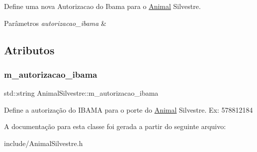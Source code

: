 Define uma nova Autorizacao do Ibama para o \hyperlink{classAnimal}{Animal} Silvestre. 


\begin{DoxyParams}{Parâmetros}
{\em autorizacao\+\_\+ibama} & \\
\hline
\end{DoxyParams}


\subsection{Atributos}
\mbox{\label{classAnimalSilvestre_a921c430fa2507062e3a2605599dd6735}} 
\subsubsection{\texorpdfstring{m\+\_\+autorizacao\+\_\+ibama}{m\_autorizacao\_ibama}}
{\footnotesize\ttfamily std\+::string Animal\+Silvestre\+::m\+\_\+autorizacao\+\_\+ibama\hspace{0.3cm}{\ttfamily [protected]}}

Define a autorização do I\+B\+A\+MA para o porte do \hyperlink{classAnimal}{Animal} Silvestre. Ex\+: 578812184 

A documentação para esta classe foi gerada a partir do seguinte arquivo\+:\begin{DoxyCompactItemize}
\item 
include/Animal\+Silvestre.\+h\end{DoxyCompactItemize}
